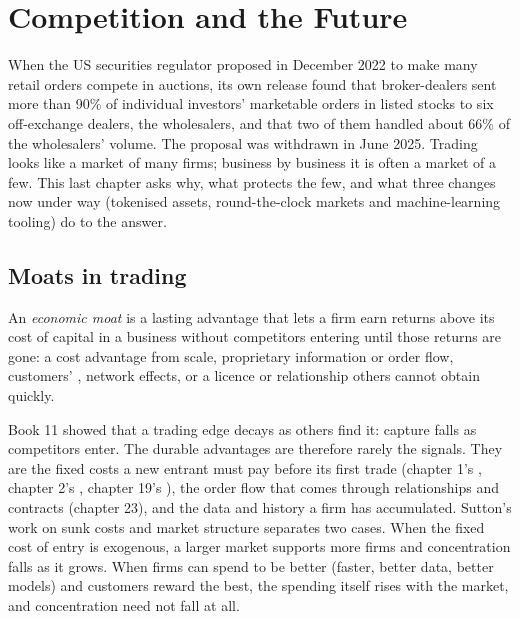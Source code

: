\chapter{Competition and the Future}\label{ch:fm:competition-and-the-future}

When the US securities regulator proposed in December 2022 to make many retail orders compete in auctions, its own release found that broker-dealers
sent more than 90\% of individual investors' marketable orders in listed stocks to six off-exchange dealers, the wholesalers, and that two of them
handled about 66\% of the wholesalers' volume. The proposal was withdrawn in June 2025. Trading looks like a market of many firms; business by
business it is often a market of a few. This last chapter asks why, what protects the few, and what three changes now under way (tokenised assets,
round-the-clock markets and machine-learning tooling) do to the answer.

\section{Moats in trading}

\begin{definition}\label{def:fm:competition-and-the-future:moat}
An \emph{economic moat} is a lasting advantage that lets a firm earn returns above its cost of capital in a business without
competitors entering until those returns are gone: a cost advantage from scale, proprietary information or order flow, customers' ,
network effects, or a licence or relationship others cannot obtain quickly.
\end{definition}

Book 11 showed that a trading edge decays as others find it: capture falls as competitors enter. The durable advantages are therefore rarely the
signals. They are the fixed costs a new entrant must pay before its first trade (chapter 1's , chapter 2's ,
chapter 19's ), the order flow that comes through relationships and contracts (chapter 23), and the data and history a firm has
accumulated. Sutton's work on sunk costs and market structure separates two cases. When the fixed cost of entry is exogenous, a larger market
supports more firms and concentration falls as it grows. When firms can spend to be better (faster, better data, better models) and customers
reward the best, the spending itself rises with the market, and concentration need not fall at all.

